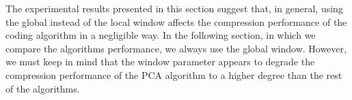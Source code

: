 The experimental results presented in this section suggest that, in general, using the global instead of the local window affects the compression performance of the coding algorithm in a negligible way. In the following section, in which we compare the algorithms performance, we always use the global window. However, we must keep in mind that the window parameter appears to degrade the compression performance of the PCA algorithm to a higher degree than the rest of the algorithms.


